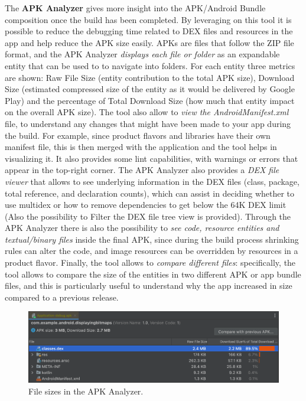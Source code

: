 \noindent The \textbf{APK Analyzer} gives more insight into the APK/Android Bundle composition once the build has been completed. By leveraging on this tool it is possible to reduce the debugging time related to DEX files and resources in the app and help reduce the APK size easily. APKs are files that follow the ZIP file format, and the APK Analyzer \textit{displays each file or folder} as an expandable entity that can be used to to navigate into folders. For each entity three metrics are shown: Raw File Size (entity contribution to the total APK size), Download Size (estimated compressed size of the entity as it would be delivered by Google Play) and the percentage of Total Download Size (how much that entity impact on the overall APK size). The tool also allow to \textit{view the AndroidManifest.xml} file, to understand any changes that might have been made to your app during the build. For example, since product flavors and libraries have their own manifest file, this is then merged with the application and the tool helps in visualizing it. It also provides some lint capabilities, with warnings or errors that appear in the top-right corner. The APK Analyzer also provides a \textit{DEX file viewer} that allows to see underlying information in the DEX files (class, package, total reference, and declaration counts), which can assist in deciding whether to use multidex or how to remove dependencies to get below the 64K DEX limit (Also the possibility to Filter the DEX file tree view is provided). Through the APK Analyzer there is also the possibility to \textit{see code, resource entities and textual/binary files} inside the final APK, since during the build process shrinking rules can alter the code, and image resources can be overridden by resources in a product flavor. Finally, the tool allows to \textit{compare different files}: specifically, the tool allows to compare the size of the entities in two different APK or app bundle files, and this is particularly useful to understand why the app increased in size compared to a previous release\cite{AndroidStudioAPKAnalyzerFeature}.

\begin{figure}
    \includegraphics[width=1.0\linewidth]{./images/apk_file_sizes.png}
    \caption[File sizes in the APK Analyzer.]{File sizes in the APK Analyzer\protect\cite{AndroidStudioAPKAnalyzerFeature}.}
\end{figure}

